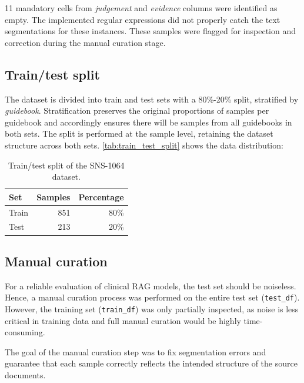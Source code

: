 \documentclass[11pt,a4paper]{article}
\begin{document}
11 mandatory cells from \textit{judgement} and \textit{evidence} columns were identified as empty. The implemented regular expressions did not properly catch the text segmentations for these instances. These samples were flagged for inspection and correction during the manual curation stage.

\subsection{Train/test split}

The dataset is divided into train and test sets with a 80\%-20\% split, stratified by \textit{guidebook}. Stratification preserves the original proportions of samples per guidebook and accordingly ensures there will be samples from all guidebooks in both sets. The split is performed at the sample level, retaining the dataset structure across both sets. \autoref{tab:train_test_split} shows the data distribution:

\begin{table}[H]
\centering
\begin{tabular}{lrr}
\toprule
\textbf{Set} & \textbf{Samples} & \textbf{Percentage} \\
\midrule
Train & 851 & 80\% \\
Test  & 213 & 20\% \\
\bottomrule
\end{tabular}
\caption{Train/test split of the SNS-1064 dataset.}
\label{tab:train_test_split}
\end{table}



\subsection{Manual curation}

For a reliable evaluation of clinical RAG models, the test set should be noiseless. Hence, a manual curation process was performed on the entire test set (\fontsize{10pt}{11pt}\texttt{test\_df}\normalsize). However, the training set  (\fontsize{10pt}{11pt}\texttt{train\_df}\normalsize) was only partially inspected, as noise is less critical in training data and full manual curation would be highly time-consuming.

The goal of the manual curation step was to fix segmentation errors and guarantee that each sample correctly reflects the intended structure of the source documents.
\end{document}
